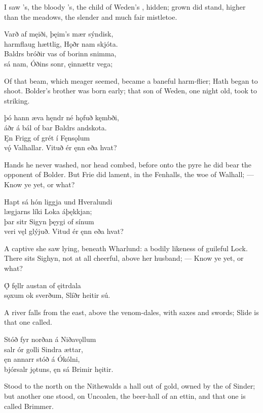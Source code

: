 \bvb I saw ’s, the bloody ’s, the child of Weden’s , hidden; grown did stand, higher than the meadows, the slender and much fair mistletoe.\evb

\bva Varð af męiði, \hld þęim’s mær sýndisk, \\%
harmflaug hættlig, \hld Hǫðr nam skjóta. \\%
Baldrs bróðir vas \hld of borinn snimma, \\%
sá nam, Óðins sonr, \hld ęinnættr vega;\eva

\bvb Of that beam, which meager seemed, became a baneful harm-flier; Hath began to shoot. Bolder’s brother was born early; that son of Weden, one night old, took to striking.\evb

\bva þó hann æva hęndr \hld né hǫfuð kęmbði, \\%
áðr á bál of bar \hld Baldrs andskota. \\%
Ęn Frigg of grét \hld í Fęnsǫlum \\%
vǫ́ Valhallar. \hld Vituð ér ęnn eða hvat?\eva

\bvb Hands he never washed, nor head combed, before onto the pyre he did bear the opponent of Bolder. But Frie did lament, in the Fenhalls, the woe of Walhall; — Know ye yet, or what?\evb

\bva Hapt sá hón liggja \hld und Hveralundi \\%
lægjarns líki \hld Loka áþękkjan; \\%
þar sitr Sigyn \hld þęygi of sínum \\%
veri vęl glýjuð. \hld Vitud ér ęnn eða hvat?\eva

\bvb A captive she saw lying, beneath Wharlund: a bodily likeness of guileful Lock. There sits Sighyn, not at all cheerful, above her husband; — Know ye yet, or what?\evb

\bva Ǫ́ fęllr austan \hld of ęitrdala \\%
sǫxum ok sverðum, \hld Slíðr heitir sú.\eva

\bvb A river falls from the east, above the venom-dales, with saxes and swords; Slide is that one called.\evb

\bva Stóð fyr norðan \hld á Niðavǫllum \\%
salr ór golli \hld Sindra ættar, \\%
ęn annarr stóð \hld á Ókólni, \\%
bjórsalr jǫtuns, \hld ęn sá Brimir hęitir.\eva

\bvb Stood to the north on the Nithewalds a hall out of gold, owned by the  of Sinder; but another one stood, on Uncoalen, the beer-hall of an ettin, and that one is called Brimmer.\evb

